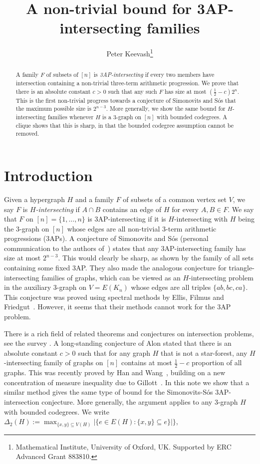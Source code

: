 \documentclass[11pt]{article}
\title{A non-trivial bound for 3AP-intersecting families}
\author{Peter Keevash\thanks{Mathematical Institute, University of Oxford, UK. Supported by ERC Advanced Grant 883810.}}
\date{}
\newcommand{\1}{\mathbf 1}
\begin{document}
\maketitle

\begin{abstract}
A family $F$ of subsets of $[n]$ is \emph{3AP-intersecting} if every two
members have intersection containing a non-trivial three-term arithmetic
progression. We prove that there is an absolute constant $c>0$ such that
any such $F$ has size at most $(\tfrac12 - c)2^n$. This is the first non-trivial
progress towards a conjecture of Simonovits and S\'os that 
the maximum possible size is $2^{n-3}$.
More generally, we show the same bound for $H$-intersecting families
whenever $H$ is a $3$-graph on $[n]$ with bounded codegrees.
A clique shows that this is sharp, in that the bounded codegree assumption cannot be removed.
\end{abstract}

\section{Introduction}

Given a hypergraph $H$ and a family $F$ of subsets of a common vertex set $V$,
we say $F$ is \emph{\(H\)-intersecting} if \(A\cap B\) contains an edge of $H$ for every \(A,B\in F\). 
We say that $F$ on $[n]=\{1,\dots,n\}$ is 3AP-intersecting if it is $H$-intersecting
with $H$ being the $3$-graph on $[n]$ whose edges are all non-trivial $3$-term arithmetic progressions (3APs).
A conjecture of Simonovits and S\'os (personal communication to the authors of~\cite{CGFS1986})
states that any 3AP-intersecting family has size at most $2^{n-3}$. This would clearly be sharp,
as shown by the family of all sets containing some fixed 3AP. They also made the analogous conjecture
for triangle-intersecting families of graphs, which can be viewed as an $H$-intersecting problem
in the auxiliary $3$-graph on $V=E(K_n)$ whose edges are all triples $\{ab,bc,ca\}$.
This conjecture was proved using spectral methods by Ellis, Filmus and Friedgut~\cite{EFF2012}. 
However, it seems that their methods cannot work for the 3AP problem.

There is a rich field of related theorems and conjectures on intersection problems, see the survey \cite{E2022}. 
A long-standing conjecture of Alon stated that there is an absolute constant $c>0$ such that 
for any graph $H$ that is not a star-forest, any $H$-intersecting family of graphs on $[n]$
contains at most $\tfrac12 - c$ proportion of all graphs. This was recently proved by Han and Wang~\cite{HanWang2026},
building on a new concentration of measure inequality due to Gillott~\cite{Gillott2026}.
In this note we show that a similar method gives the same type of bound
for the Simonovits-S\'os 3AP-intersection conjecture. More generally,
the argument applies to any $3$-graph $H$ with bounded codegrees.
We write $\Delta_2(H) := \max_{\{x,y\}\subseteq V(H)}  |\{e\in E(H):\{x,y\}\subseteq e\}|\}$,
\end{document}

